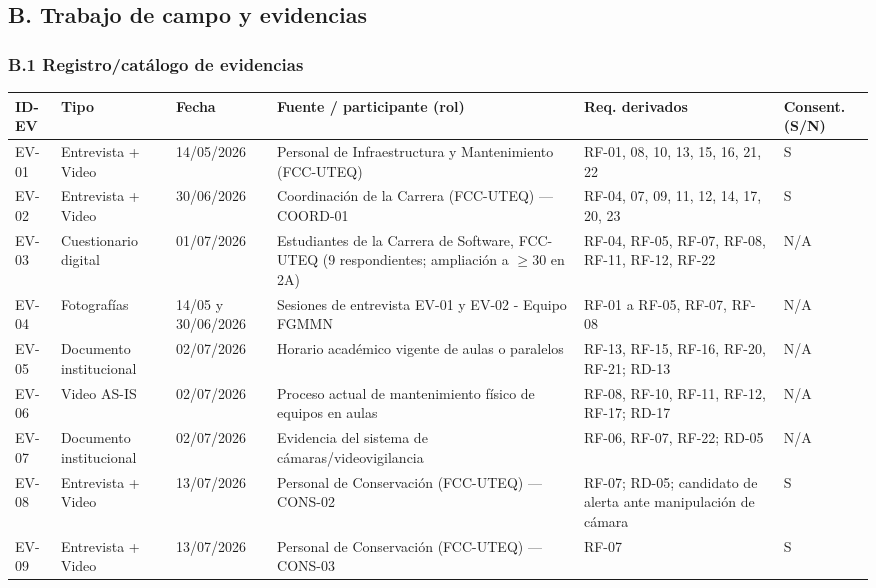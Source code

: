 \subsection*{B. Trabajo de campo y evidencias}


\subsubsection*{B.1 Registro/catálogo de evidencias}


\begingroup
\small
\begin{longtable}{|p{2.6cm}|p{2.6cm}|p{2.6cm}|p{2.6cm}|p{2.6cm}|p{2.6cm}|}
\hline
ID-EV & Tipo & Fecha & Fuente / participante (rol) & Req. derivados & Consent. (S/N) \\ \hline
EV-01 & Entrevista + Video & 14/05/2026 & Personal de Infraestructura y Mantenimiento (FCC-UTEQ) & RF-01, 08, 10, 13, 15, 16, 21, 22 & S \\ \hline
EV-02 & Entrevista + Video & 30/06/2026 & Coordinación de la Carrera (FCC-UTEQ) --- COORD-01 & RF-04, 07, 09, 11, 12, 14, 17, 20, 23 & S \\ \hline
EV-03 & Cuestionario digital & 01/07/2026 & Estudiantes de la Carrera de Software, FCC-UTEQ (9 respondientes; ampliación a $\geq$30 en 2A) & RF-04, RF-05, RF-07, RF-08, RF-11, RF-12, RF-22 & N/A \\ \hline
EV-04 & Fotografías & 14/05 y 30/06/2026 & Sesiones de entrevista EV-01 y EV-02 - Equipo FGMMN & RF-01 a RF-05, RF-07, RF-08 & N/A \\ \hline
EV-05 & Documento institucional & 02/07/2026 & Horario académico vigente de aulas o paralelos & RF-13, RF-15, RF-16, RF-20, RF-21; RD-13 & N/A \\ \hline
EV-06 & Video AS-IS & 02/07/2026 & Proceso actual de mantenimiento físico de equipos en aulas & RF-08, RF-10, RF-11, RF-12, RF-17; RD-17 & N/A \\ \hline
EV-07 & Documento institucional & 02/07/2026 & Evidencia del sistema de cámaras/videovigilancia & RF-06, RF-07, RF-22; RD-05 & N/A \\ \hline
EV-08 & Entrevista + Video & 13/07/2026 & Personal de Conservación (FCC-UTEQ) --- CONS-02 & RF-07; RD-05; candidato de alerta ante manipulación de cámara & S \\ \hline
EV-09 & Entrevista + Video & 13/07/2026 & Personal de Conservación (FCC-UTEQ) --- CONS-03 & RF-07 & S \\ \hline

\end{longtable}
